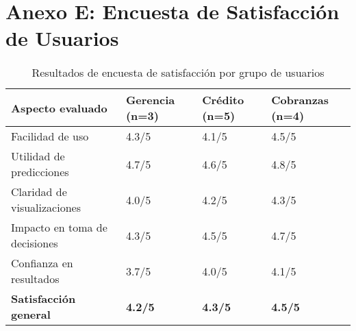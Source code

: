 \section{Anexo E: Encuesta de Satisfacción de Usuarios}

\begin{table}[ht]
\centering
\begin{tabular}{|p{5cm}|p{2cm}|p{2cm}|p{2cm}|}
\hline
\textbf{Aspecto evaluado} & \textbf{Gerencia \newline (n=3)} & \textbf{Crédito \newline (n=5)} & \textbf{Cobranzas \newline (n=4)} \\
\hline
Facilidad de uso & 4.3/5 & 4.1/5 & 4.5/5 \\
\hline
Utilidad de predicciones & 4.7/5 & 4.6/5 & 4.8/5 \\
\hline
Claridad de visualizaciones & 4.0/5 & 4.2/5 & 4.3/5 \\
\hline
Impacto en toma de decisiones & 4.3/5 & 4.5/5 & 4.7/5 \\
\hline
Confianza en resultados & 3.7/5 & 4.0/5 & 4.1/5 \\
\hline
\textbf{Satisfacción general} & \textbf{4.2/5} & \textbf{4.3/5} & \textbf{4.5/5} \\
\hline
\end{tabular}
\caption{Resultados de encuesta de satisfacción por grupo de usuarios}
\end{table}